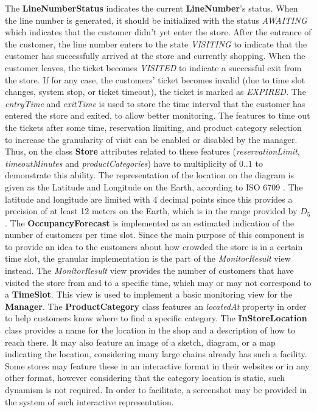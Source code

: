 The \textbf{LineNumberStatus} indicates the current \textbf{LineNumber}'s status.
When the line number is generated, it should be initialized with the status \textit{AWAITING} which indicates that the customer didn't yet enter the store.
After the entrance of the customer, the line number enters to the state \textit{VISITING} to indicate that the customer has successfully arrived at the store and currently shopping.
When the customer leaves, the ticket becomes \textit{VISITED} to indicate a successful exit from the store.
If for any case, the customers' ticket becomes invalid (due to time slot changes, system stop, or ticket timeout), the ticket is marked as \textit{EXPIRED}.
The \textit{entryTime} and \textit{exitTime} is used to store the time interval that the customer has entered the store and exited, to allow better monitoring.
The features to time out the tickets after some time, reservation limiting, and product category selection to increase the granularity of visit can be enabled or disabled by the manager.
Thus, on the class \textbf{Store} attributes related to these features (\textit{reservationLimit}, \textit{timeoutMinutes} and \textit{productCategories}) have to multiplicity of $0..1$ to demonstrate this ability.
The representation of the location on the diagram is given as the Latitude and Longitude on the Earth, according to ISO 6709 \cite{isogeo}.
The latitude and longitude are limited with 4 decimal points since this provides a precision of at least 12 meters on the Earth, which is in the range provided by $D_{5}$.
The \textbf{OccupancyForecast} is implemented as an estimated indication of the number of customers per time slot.
Since the main purpose of this component is to provide an idea to the customers about how crowded the store is in a certain time slot, the granular implementation is the part of the \textit{MonitorResult} view instead.
The \textit{MonitorResult} view provides the number of customers that have visited the store from and to a specific time, which may or may not correspond to a \textbf{TimeSlot}.
This view is used to implement a basic monitoring view for the \textbf{Manager}.
The \textbf{ProductCategory} class features an \textit{locatedAt} property in order to help customers know where to find a specific category.
The \textbf{InStoreLocation} class provides a name for the location in the shop and a description of how to reach there.
It may also feature an image of a sketch, diagram, or a map indicating the location, considering many large chains already has such a facility.
Some stores may feature these in an interactive format in their websites or in any other format, however considering that the category location is static, such dynamism is not required.
In order to facilitate, a screenshot may be provided in the system of such interactive representation.

